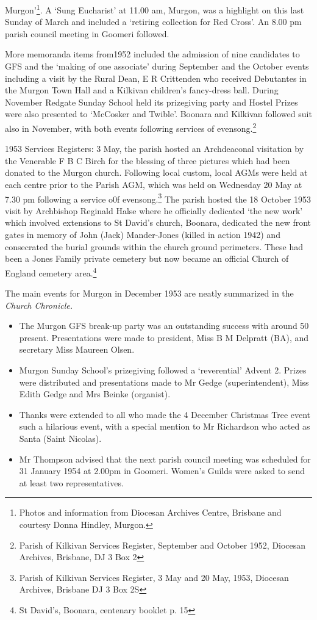 Murgon'\footnote{Photos and information from Diocesan Archives Centre,
  Brisbane and courtesy Donna Hindley, Murgon.}. A `Sung Eucharist' at
11.00 am, Murgon, was a highlight on this last Sunday of March and
included a `retiring collection for Red Cross'. An 8.00 pm parish
council meeting in Goomeri followed.

More memoranda items from1952 included the admission of nine candidates
to GFS and the `making of one associate' during September and the
October events including a visit by the Rural Dean, E R Crittenden who
received Debutantes in the Murgon Town Hall and a Kilkivan children's
fancy-dress ball. During November Redgate Sunday School held its
prizegiving party and Hostel Prizes were also presented to `McCosker and
Twible'. Boonara and Kilkivan followed suit also in November, with both
events following services of evensong.\footnote{Parish of Kilkivan
  Services Register, September and October 1952, Diocesan Archives,
  Brisbane, DJ 3 Box 2}

1953 Services Registers: 3 May, the parish hosted an Archdeaconal
visitation by the Venerable F B C Birch for the blessing of three
pictures which had been donated to the Murgon church. Following local
custom, local AGMs were held at each centre prior to the Parish AGM,
which was held on Wednesday 20 May at 7.30 pm following a service o0f
evensong.\footnote{Parish of Kilkivan Services Register, 3 May and 20
  May, 1953, Diocesan Archives, Brisbane DJ 3 Box 2S} The parish hosted
the 18 October 1953 visit by Archbishop Reginald Halse where he
officially dedicated `the new work' which involved extensions to St
David's church, Boonara, dedicated the new front gates in memory of John
(Jack) Mander-Jones (killed in action 1942) and consecrated the burial
grounds within the church ground perimeters. These had been a Jones
Family private cemetery but now became an official Church of England
cemetery area.\footnote{St David's, Boonara, centenary booklet p. 15}

The main events for Murgon in December 1953 are neatly summarized in the
\emph{Church Chronicle.}

\begin{itemize}
\item
  The Murgon GFS break-up party was an outstanding success with around
  50 present. Presentations were made to president, Miss B M Delpratt
  (BA), and secretary Miss Maureen Olsen.
\item
  Murgon Sunday School's prizegiving followed a `reverential' Advent 2.
  Prizes were distributed and presentations made to Mr Gedge
  (superintendent), Miss Edith Gedge and Mrs Beinke (organist).
\item
  Thanks were extended to all who made the 4 December Christmas Tree
  event such a hilarious event, with a special mention to Mr Richardson
  who acted as Santa (Saint Nicolas).
\item
  Mr Thompson advised that the next parish council meeting was scheduled
  for 31 January 1954 at 2.00pm in Goomeri. Women's Guilds were asked to
  send at least two representatives.
\end{itemize}

